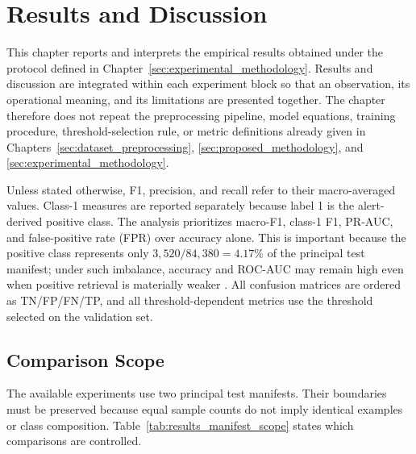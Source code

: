 %
\providecommand{\resultsfigurepath}{doc/figures}

\chapter{Results and Discussion}
\label{sec:results}

This chapter reports and interprets the empirical results obtained under the
protocol defined in Chapter~\ref{sec:experimental_methodology}. Results and
discussion are integrated within each experiment block so that an observation,
its operational meaning, and its limitations are presented together. The
chapter therefore does not repeat the preprocessing pipeline, model equations,
training procedure, threshold-selection rule, or metric definitions already
given in Chapters~\ref{sec:dataset_preprocessing},
\ref{sec:proposed_methodology}, and
\ref{sec:experimental_methodology}.

Unless stated otherwise, F1, precision, and recall refer to their
macro-averaged values. Class-1 measures are reported separately because label
1 is the alert-derived positive class. The analysis prioritizes macro-F1,
class-1 F1, PR-AUC, and false-positive rate (FPR) over accuracy alone. This is
important because the positive class represents only $3{,}520/84{,}380=4.17\%$
of the principal test manifest; under such imbalance, accuracy and ROC-AUC may
remain high even when positive retrieval is materially weaker
\cite{SaitoRehmsmeier2015}. All confusion matrices are ordered as
TN/FP/FN/TP, and all threshold-dependent metrics use the threshold selected on
the validation set.

\section{Comparison Scope}
\label{subsec:results_comparison_boundaries}

The available experiments use two principal test manifests. Their boundaries must be
preserved because equal sample counts do not imply identical examples or class
composition. Table~\ref{tab:results_manifest_scope} states which comparisons
are controlled.


